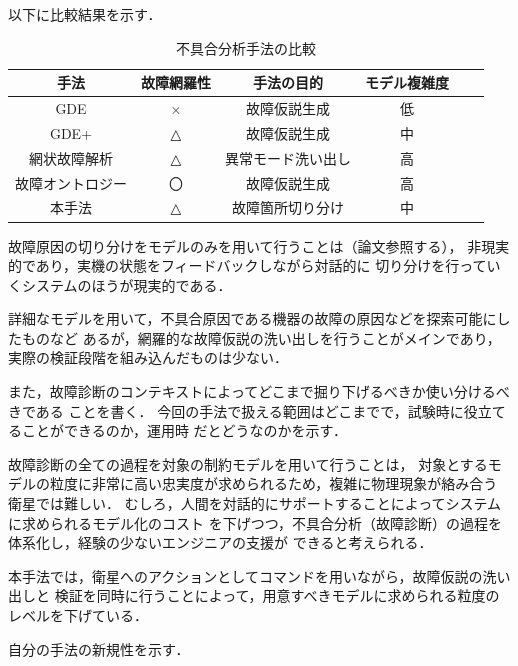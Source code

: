 \documentclass[11pt]{article}
\begin{document}
以下に比較結果を示す．
\begin{table}[H]
   \centering
   \caption{不具合分析手法の比較}
      \begin{tabular}{cccccc} \hline%
         手法&故障網羅性&手法の目的&モデル複雑度%
         \\ \hline
         GDE&×&故障仮説生成&低\\
         GDE+\cite{Struss1989}&△&故障仮説生成&中\\
         網状故障解析\cite{Yamaguchi2014}&△&異常モード洗い出し&高\\
         故障オントロジー\cite{Kitamura1999}&〇&故障仮説生成&高\\
         本手法&△&故障箇所切り分け&中\\ \hline
      \end{tabular}
\end{table}

故障原因の切り分けをモデルのみを用いて行うことは（論文参照する），
非現実的であり，実機の状態をフィードバックしながら対話的に
切り分けを行っていくシステムのほうが現実的である．

詳細なモデルを用いて，不具合原因である機器の故障の原因などを探索可能にしたものなど
あるが，網羅的な故障仮説の洗い出しを行うことがメインであり，
実際の検証段階を組み込んだものは少ない．

また，故障診断のコンテキストによってどこまで掘り下げるべきか使い分けるべきである
\cite{Ontology1998}ことを書く．
今回の手法で扱える範囲はどこまでで，試験時に役立てることができるのか，運用時
だとどうなのかを示す．

故障診断の全ての過程を対象の制約モデルを用いて行うことは，
対象とするモデルの粒度に非常に高い忠実度が求められるため，複雑に物理現象が絡み合う
衛星では難しい．
むしろ，人間を対話的にサポートすることによってシステムに求められるモデル化のコスト
を下げつつ，不具合分析（故障診断）の過程を体系化し，経験の少ないエンジニアの支援が
できると考えられる．


本手法では，衛星へのアクションとしてコマンドを用いながら，故障仮説の洗い出しと
検証を同時に行うことによって，用意すべきモデルに求められる粒度のレベルを下げている．

自分の手法の新規性を示す．
\end{document}
